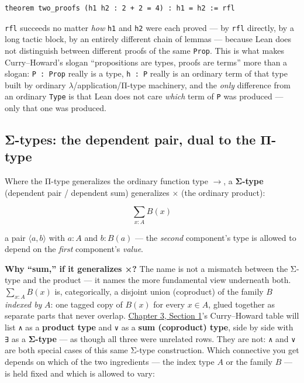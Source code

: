 \begin{lstlisting}
theorem two_proofs (h1 h2 : 2 + 2 = 4) : h1 = h2 := rfl
\end{lstlisting}

\texttt{rfl} succeeds no matter \emph{how} \texttt{h1} and \texttt{h2} were each proved --- by \texttt{rfl} directly, by a long tactic block, by an entirely different chain of lemmas --- because Lean does not distinguish between different proofs of the same \texttt{Prop}. This is what makes Curry--Howard's slogan ``propositions are types, proofs are terms'' more than a slogan: \texttt{P : Prop} really is a type, \texttt{h : P} really is an ordinary term of that type built by ordinary \(\lambda\)/application/Π-type machinery, and the \emph{only} difference from an ordinary \texttt{Type} is that Lean does not care \emph{which} term of \texttt{P} was produced --- only that one was produced.

\subsection{Σ-types: the dependent pair, dual to the Π-type}\label{sec:01-basics:05-pi-sigma-and-coc:4}

Where the Π-type generalizes the ordinary function type \(\to\), a \textbf{Σ-type} (dependent pair / dependent sum) generalizes \(\times\) (the ordinary product):

\[
\sum_{x:A} B(x)
\]

a pair \(\langle a, b\rangle\) with \(a : A\) and \(b : B(a)\) --- the \emph{second} component's type is allowed to depend on the \emph{first} component's \emph{value}.

\textbf{Why ``sum,'' if it generalizes ×?} The name is not a mismatch between the Σ-type and the product --- it names the more fundamental view underneath both. \(\sum_{x:A} B(x)\) is, categorically, a disjoint union (coproduct) of the family \(B\) \emph{indexed by} \(A\): one tagged copy of \(B(x)\) for every \(x \in A\), glued together as separate parts that never overlap. \hyperref[sec:03-propositions-and-proofs:01-prop:1]{Chapter 3, Section 1}'s Curry--Howard table will list \texttt{∧} as a \textbf{product type} and \texttt{∨} as a \textbf{sum (coproduct) type}, side by side with \texttt{∃} as a \textbf{Σ-type} --- as though all three were unrelated rows. They are not: \texttt{∧} and \texttt{∨} are both special cases of this same Σ-type construction. Which connective you get depends on which of the two ingredients --- the index type \(A\) or the family \(B\) --- is held fixed and which is allowed to vary:

